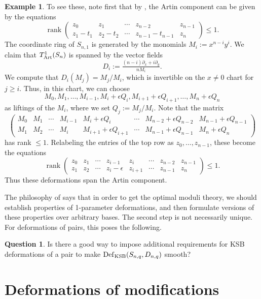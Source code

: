 \documentclass{amsart}
\theoremstyle{definition}
\newtheorem{exmp}[thm]{Example}
\newtheorem{ques}[thm]{Question}    %
\theoremstyle{remark}
\newcommand{\rank}[0]{\operatorname{rank}}
\newcommand{\dx}[0]{\partial_x}
\newcommand{\dy}[0]{\partial_y}
\newcommand{\defsp}[0]{\operatorname{Def}}
\begin{document}
\begin{exmp}
To see these, note first  that by
\cite{pinkham}, the Artin component can be given by the  equations 
$$
\rank
\left(
\begin{array}{ccccc}
  z_0 & z_1 & \cdots &  z_{n-2} & z_{n-1}\\ 
 z_1-t_1 & z_2-t_2 & \cdots &  z_{n-1}-t_{n-1} & z_{n}
\end{array}
\right) \leq 1.
$$
The coordinate ring of $S_{n,1}$ is generated by the monomials
$M_i:=x^{n-i}y^i$. We claim that $T^1_{\rm Art}(S_n)$ is spanned
 by the vector fields
$$
D_i:=\tfrac{(n-i)\dx+i\dy}{nM_i}.
$$
We compute that 
$D_i(M_j)=M_j/M_i$,
which is invertible on the $x\neq 0$ chart for $j\geq i$. Thus, in this chart, we can choose 
$$
M_0, M_1, \dots, M_{i-1}, M_i+\epsilon Q_i,
M_{i+1}+\epsilon Q_{i+1},\dots,
M_n+\epsilon Q_n
$$
as liftings of the $M_i$, where we set  $Q_j:={M_j}/{M_i}$.
Note that  the matrix
$$
\left(
\begin{array}{ccccccccc}
  M_0 & M_1 & \cdots & M_{i-1} & M_i+\epsilon Q_i & \cdots & M_{n-2}+\epsilon Q_{n-2} & M_{n-1}+\epsilon Q_{n-1}\\
  M_1 & M_2 & \cdots & M_i & M_{i+1}+\epsilon Q_{i+1}&\cdots &  M_{n-1}+\epsilon Q_{n-1} & M_n+\epsilon Q_n
\end{array}
\right)
$$
has rank $\leq 1$. Relabeling the entries of the top row as
$z_0,\dots, z_{n-1}$, these become  the equations
$$
\rank
\left(
\begin{array}{ccccccccc}
  z_0 & z_1 & \cdots & z_{i-1} & z_i & \cdots &  z_{n-2} & z_{n-1}\\ 
 z_1 & z_2 & \cdots & z_{i}-\epsilon & z_{i+1} & \cdots &  z_{n-1} & z_{n}
\end{array}
\right) \leq 1.
$$
Thus these deformations span the Artin component.
\end{exmp}

The philosophy of \cite{k-modbook} says that in order to get the optimal moduli theory, we should  establish properties of 1-parameter deformations, and then formulate versions of these   properties  over arbitrary bases.
The second step is not necessarily unique. 
For deformations of pairs, this poses the following.


\begin{ques} Is there a good way to impose additional requirements for KSB deformations of a pair to make  $\defsp_{\rm KSB}(S_{n,q}, D_{n,q})$ smooth?
    \end{ques}



\section{Deformations of modifications}\label{def.mod.sect}
\end{document}
